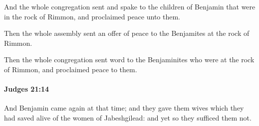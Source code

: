 			\begin{versebox}
					\item[BHS] 
					\item[ASV] And the whole congregation sent and spake to the children of Benjamin that were in the rock of Rimmon, and proclaimed peace unto them.
					\item[NIV] Then the whole assembly sent an offer of peace to the Benjamites at the rock of Rimmon.
					\item[NRSV] Then the whole congregation sent word to the Benjaminites who were at the rock of Rimmon, and proclaimed peace to them.
			\end{versebox}

		\paragraph{Judges 21:14} %
			\label{JUDGES-21-14}

			And Benjamin came again at that time; and they gave them wives which they had saved alive of the women of Jabeshgilead: and yet so they sufficed them not.

